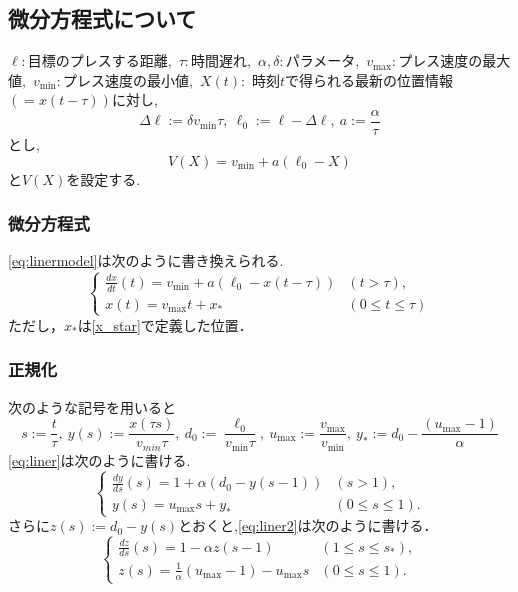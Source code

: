 \documentclass [dvipdfmx] {jsarticle}
\numberwithin{equation}{section}
\theoremstyle{definition} %
\theoremstyle{definition} %
\begin{document}
\subsection{微分方程式について}
$\ell:$目標のプレスする距離,\ $\tau:$時間遅れ,\ $\alpha,\delta:$パラメータ,\ 
$v_{\max}:$プレス速度の最大値,\ $v_{\min}:$プレス速度の最小値,\ $X(t):$
時刻$t$で得られる最新の位置情報$(=x(t-\tau))$に対し,
\begin{equation}
    \Delta\ell :=\delta v_{\min}\tau,\ \ell_0:=\ell-\Delta\ell,\ a:=\frac{\alpha}{\tau}
\end{equation}
とし,
\begin{equation}\label{eq:linermodel}
    V(X)=v_{\min}+a(\ell_0-X)
\end{equation}
と$V(X)$を設定する.


\subsubsection{微分方程式}
\eqref{eq:linermodel}は次のように書き換えられる.
\begin{equation}\label{eq:liner}\begin{cases}
    \displaystyle\frac{dx}{dt}(t)=v_{\min}+a(\ell_0-x(t-\tau)) &(t>\tau),\\
    x(t)=v_{\max}t+x_\ast &(0\le t \le \tau)
\end{cases}\end{equation}
ただし，$x_\ast$は\eqref{x_star}で定義した位置．

\subsubsection{正規化}
次のような記号を用いると
\begin{equation}
    s:=\displaystyle\frac{t}{\tau},\ y(s):=\displaystyle\frac{x(\tau s)}{v_{min}\tau},\
    d_0:=\frac{\ell_0}{v_{\min}\tau},\ u_{\max}:=\displaystyle\frac{v_{\max}}{v_{\min}},\ 
    y_\ast:=d_0-\displaystyle\frac{(u_{\max}-1)}{\alpha}
\end{equation}
\eqref{eq:liner}は次のように書ける.
\begin{equation}\label{eq:liner2}\begin{cases}
    \displaystyle\frac{dy}{ds}(s)=1+\alpha(d_0-y(s-1)) &(s>1),\\
    y(s)=u_{\max}s+y_\ast &(0\le s \le 1).
\end{cases}\end{equation}
さらに$z(s):=d_0-y(s)$とおくと,\eqref{eq:liner2}は次のように書ける．
\begin{equation}\begin{cases}
    \displaystyle\frac{dz}{ds}(s)=1-\alpha z(s-1) &(1\le s\le s_\ast),\\
    z(s)=\displaystyle\frac{1}{\alpha}(u_{\max}-1)-u_{\max}s &(0\le s\le 1).
\end{cases}\end{equation}
\end{document}
